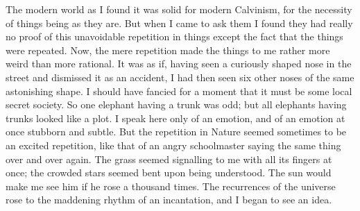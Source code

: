 The modern world as I found it was solid for modern Calvinism, for the necessity of things being as they are. But when I came to ask them I found they had really no proof of this unavoidable repetition in things except the fact that the things were repeated. Now, the mere repetition made the things to me rather more weird than more rational. It was as if, having seen a curiously shaped nose in the street and dismissed it as an accident, I had then seen six other noses of the same astonishing shape. I should have fancied for a moment that it must be some local secret society. So one elephant having a trunk was odd; but all elephants having trunks looked like a plot. I speak here only of an emotion, and of an emotion at once stubborn and subtle. But the repetition in Nature seemed sometimes to be an excited repetition, like that of an angry schoolmaster saying the same thing over and over again. The grass seemed signalling to me with all its fingers at once; the crowded stars seemed bent upon being understood. The sun would make me see him if he rose a thousand times. The recurrences of the universe rose to the maddening rhythm of an incantation, and I began to see an idea.

